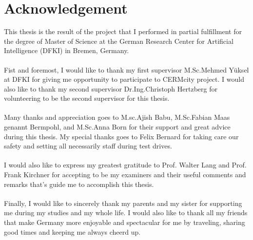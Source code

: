 \chapter*{Acknowledgement}
This thesis is the result of the project that I performed in partial fulfillment
for the degree of Master of Science at the German Research Center for Artificial Intelligence (DFKI) in Bremen, Germany.
\\
\\
\noindent Fist and foremost, I would like to thank my first supervisor M.Sc.Mehmed Yüksel at DFKI for giving me opportunity to participate to CERMcity project. I would also like to thank my second supervisor Dr.Ing.Christoph Hertzberg for volunteering to be the second supervisor for this thesis.
\\
\\
\noindent Many thanks and appreciation goes to M.sc.Ajish Babu, M.Sc.Fabian Maas genannt Bermpohl, and M.Sc.Anna Born for their support and great advice during this thesis. My special thanks goes to Felix Bernard for taking care our safety and setting all necessarily staff during test drives.
\\
\\
\noindent I would also like to express my greatest gratitude to Prof. Walter Lang and Prof. Frank Kirchner for accepting to be my examiners and their useful comments and remarks that's guide me to accomplish this thesis.
\\
\\ 
\noindent Finally, I would like to sincerely thank my parents and my sister for supporting me during my studies and my whole life. I would also like to thank all my friends that make Germany more enjoyable and spectacular for me by traveling, sharing good times and keeping me always cheerd up.